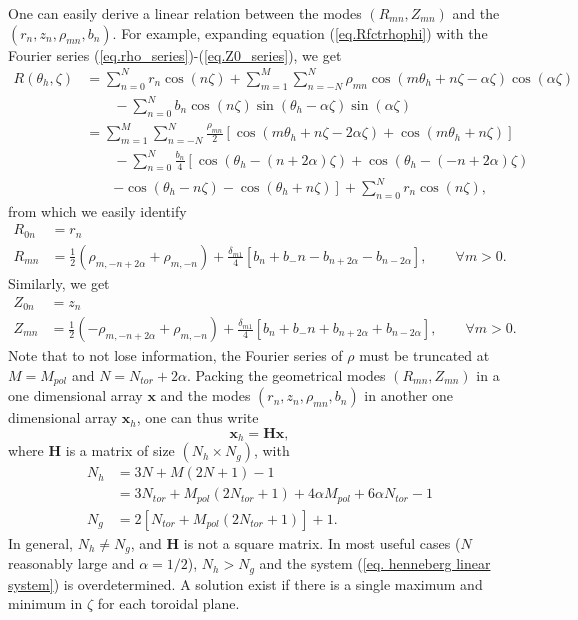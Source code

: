 \documentclass[my_thesis.tex]{subfiles}
\begin{document}
One can easily derive a linear relation between the modes $(R_{mn},Z_{mn})$ and the $(r_n,z_n,\rho_{mn},b_n)$. For example, expanding equation (\ref{eq.Rfctrhophi}) with the Fourier series (\ref{eq.rho_series})-(\ref{eq.Z0_series}), we get
\begin{align}
	R(\theta_h,\zeta) &= \sum_{n=0}^Nr_n \cos(n \zeta) + \sum_{m=1}^{M}\sum_{n=-N}^N \rho_{mn}\cos(m\theta_h +n\zeta -\alpha \zeta)\cos(\alpha \zeta)\\
	&\qquad - \sum_{n=0}^N b_n\cos(n\zeta)\sin(\theta_h-\alpha \zeta)\sin(\alpha \zeta)\\
	&=\sum_{m=1}^{M}\sum_{n=-N}^N \frac{\rho_{mn}}{2}\left[\cos(m\theta_h +n\zeta -2\alpha \zeta)+\cos(m\theta_h+n\zeta)\right]\\
	&\qquad- \sum_{n=0}^N \frac{b_n}{4}\left[\cos(\theta_h-(n+2\alpha)\zeta)+\cos(\theta_h-(-n+2\alpha)\zeta)\right.\\
	&\qquad\left.-\cos(\theta_h-n\zeta)-\cos(\theta_h+n\zeta)\right] +  \sum_{n=0}^Nr_n \cos(n \zeta),
\end{align}
from which we easily identify
\begin{align}
	R_{0n} &= r_n\\
	R_{mn} &= \frac{1}{2}(\rho_{m,-n+2\alpha}+\rho_{m,-n}) + \frac{\delta_{m1}}{4}\left[b_n+b_-n-b_{n+2\alpha}-b_{n-2\alpha}\right], \qquad \forall m>0. \label{eq, linear relation Rmn}
\end{align}
Similarly, we get
\begin{align}
	Z_{0n} &= z_n\\
	Z_{mn} &= \frac{1}{2}(-\rho_{m,-n+2\alpha}+\rho_{m,-n}) + \frac{\delta_{m1}}{4}\left[b_n+b_-n+b_{n+2\alpha}+b_{n-2\alpha}\right], \qquad \forall m>0.	\label{eq, linear relation Zmn}
\end{align}
Note that to not lose information, the Fourier series of $\rho$ must be truncated at $M=M_{pol}$ and $N=N_{tor}+2\alpha$. Packing the geometrical modes $(R_{mn},Z_{mn})$ in a one dimensional array $\mathbf{x}$ and the modes $(r_n,z_n,\rho_{mn},b_n)$ in another one dimensional array $\mathbf{x}_h$, one can thus write
\begin{equation}
	\mathbf{x}_h = \mathbf{H}\mathbf{x}, \label{eq. henneberg linear system}
\end{equation}
where $\mathbf{H}$ is a matrix of size $(N_h\times N_g)$, with
\begin{align}
	N_h &= 3N + M(2N+1) -1 \\
	&= 3N_{tor} + M_{pol}(2N_{tor}+1) + 4\alpha M_{pol} + 6\alpha N_{tor} -1\\
	N_g & = 2[N_{tor}+M_{pol}(2N_{tor}+1)]+1.
\end{align}
In general, $N_h \neq N_g$, and $\mathbf{H}$ is not a square matrix. In most useful cases ($N$ reasonably large and $\alpha=1/2$), $N_h>N_g$ and the system (\ref{eq. henneberg linear system}) is overdetermined. A solution exist if there is a single maximum and minimum in $\zeta$ for each toroidal plane.
\end{document}
